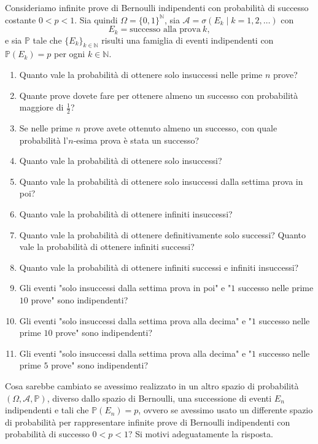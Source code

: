 Consideriamo infinite prove di Bernoulli indipendenti con probabilità di successo costante $0< p< 1$. Sia quindi $\Omega =\{0,1\}^{\mathbb{N}}$, sia $\mathcal{A} =\sigma ( E_{k} \mid k=1,2,\dotsc )$ con
\begin{equation*}
E_{k} =\text{successo alla prova} \ k,
\end{equation*}
e sia $\mathbb{P}$ tale che $\{E_{k}\}_{k\in \mathbb{N}}$ risulti una famiglia di eventi indipendenti con $\mathbb{P}( E_{k}) =p$ per ogni $k\in \mathbb{N}$.
\begin{enumerate}
\item Quanto vale la probabilità di ottenere solo insuccessi nelle prime $n$ prove?
\item Quante prove dovete fare per ottenere almeno un successo con probabilità maggiore di $\frac{1}{2}$?
\item Se nelle prime $n$ prove avete ottenuto almeno un successo, con quale probabilità l'$n$-esima prova è stata un successo?
\item Quanto vale la probabilità di ottenere solo insuccessi?
\item Quanto vale la probabilità di ottenere solo insuccessi dalla settima prova in poi?
\item Quanto vale la probabilità di ottenere infiniti insuccessi?
\item Quanto vale la probabilità di ottenere definitivamente solo successi? Quanto vale la probabilità di ottenere infiniti successi?
\item Quanto vale la probabilità di ottenere infiniti successi e infiniti insuccessi?
\item Gli eventi "solo insuccessi dalla settima prova in poi" e "$1$ successo nelle prime $10$ prove" sono indipendenti?
\item Gli eventi "solo insuccessi dalla settima prova alla decima" e "$1$ successo nelle prime $10$ prove" sono indipendenti?
\item Gli eventi "solo insuccessi dalla settima prova alla decima" e "$1$ successo nelle prime $5$ prove" sono indipendenti?
\end{enumerate}

Cosa sarebbe cambiato se avessimo realizzato in un altro spazio di probabilità $( \Omega ,\mathcal{A} ,\mathbb{P})$, diverso dallo spazio di Bernoulli, una successione di eventi $E_{n}$ indipendenti e tali che $\mathbb{P}( E_{n}) =p$, ovvero se avessimo usato un differente spazio di probabilità per rappresentare infinite prove di Bernoulli indipendenti con probabilità di successo $0< p< 1$? Si motivi adeguatamente la risposta.

